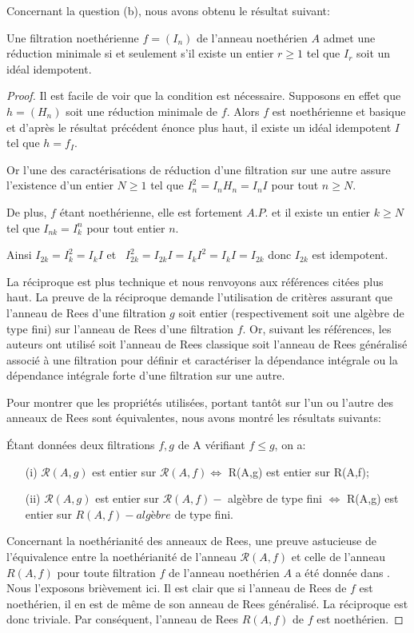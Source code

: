 Concernant la question (b), nous avons obtenu le résultat suivant:

\begin{maproposition}
	Une filtration noethérienne $f=(I_{n})$ de l'anneau noethérien $A$
	admet une réduction minimale si et seulement s'il existe un entier $r\geq 1$ tel que $I_{r}$ soit un idéal idempotent.
\end{maproposition}
\begin{proof}
	Il est facile de voir que la condition est nécessaire. Supposons en effet que $h=(H_{n})$ soit une réduction minimale de $f$. Alors $f $ est noethérienne et basique et d'après le résultat précédent énonce plus haut, il existe un idéal idempotent $I$ tel que $h=f_{I}$. 
	
	Or l'une des caractérisations de réduction d'une filtration sur une
	autre assure l'existence d'un entier $N\geq 1$ tel que $I_{n}^{2}=I_{n}H_{n}=I_{n}I$ pour tout $n\geq N$. 
	
	De plus, $f$ étant noethérienne, elle est fortement $A.P.$ et il
	existe un entier $k\geq N$ tel que $I_{nk}=I_{k}^{n}$ pour tout entier $n$. 
	
	Ainsi $I_{2k}=I_{k}^{2}=I_{k}I$ et \ $I_{2k}^{2}=I_{2k}I=I_{k}I^{2}=I_{k}I=I_{2k}$ donc $I_{2k}$ est idempotent.
	
	La réciproque est plus technique et nous renvoyons aux références citées plus haut. La preuve de la réciproque demande l'utilisation de critères assurant que l'anneau de Rees d'une filtration $g$ soit entier (respectivement soit une algèbre de type fini) sur l'anneau de Rees d'une filtration $f.$ Or, suivant les références, les auteurs ont utilisé soit l'anneau de Rees classique soit l'anneau de Rees généralisé associé à une filtration pour définir et caractériser la dépendance intégrale ou la dépendance intégrale forte d'une filtration sur une autre. 
	
	Pour montrer que les propriétés utilisées, portant tantôt sur l'un ou l'autre des anneaux de
	Rees sont équivalentes, nous avons montré les résultats suivants:
	
	Étant données deux filtrations $f,g$ de A vérifiant $f\leq g$, on a:
	\begin{enumerate}
		\item[(i)]  $\mathcal{R}(A,g)$ est entier sur $\mathcal{R}(A,f)\Longleftrightarrow $ R(A,g) est entier	sur R(A,f);
		\item[(ii)] $\mathcal{R}(A,g)$ est entier sur $\mathcal{R}(A,f)-$ algèbre de type fini $\Longleftrightarrow $ R(A,g) est entier sur $R(A,f)-algèbre$ de type fini.
	\end{enumerate}
	Concernant la noethérianité des anneaux de Rees, une preuve astucieuse de l'équivalence entre la noethérianité de l'anneau $\mathcal{R}(A,f)$ et celle de l'anneau $R(A,f)$ pour toute filtration $f$ de l'anneau noethérien $A$ a été donnée dans \cite{Ra2}. Nous l'exposons brièvement ici. Il est clair que si l'anneau de Rees de $f$ est noethérien, il en est de m\^{e}me de son anneau de Rees généralisé. La réciproque est donc triviale. Par conséquent, l'anneau de Rees $R(A,f)$ de $f$ est noethérien.
	
\end{proof}


